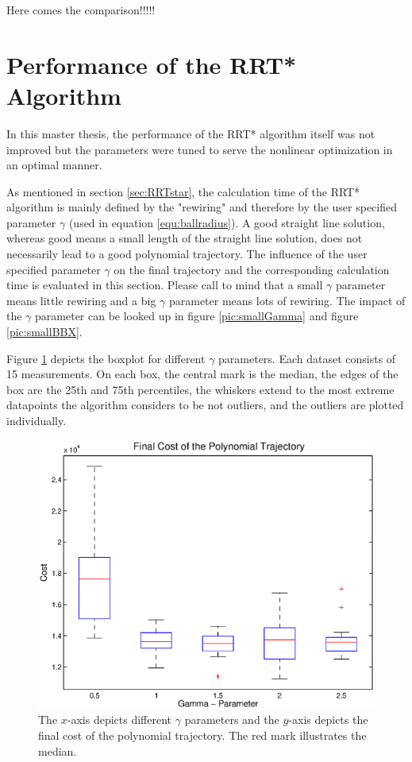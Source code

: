 Here comes the comparison!!!!!

\newpage


\section{Performance of the RRT* Algorithm}

In this master thesis, the performance of the RRT* algorithm itself was not improved but the parameters were tuned to serve the nonlinear optimization in an optimal manner.

As mentioned in section \ref{sec:RRTstar}, the calculation time of the RRT* algorithm is mainly defined by the "rewiring" and therefore by the user specified parameter $\gamma$ (used in equation \ref{equ:ballradius}). A good straight line solution, whereas good means a small length of the straight line solution, does not necessarily lead to a good polynomial trajectory. The influence of the user specified parameter $\gamma$ on the final trajectory and the corresponding calculation time is evaluated in this section. \newline
Please call to mind that a small $\gamma$ parameter means little rewiring and a big $\gamma$ parameter means lots of rewiring. The impact of the $\gamma$ parameter can be looked up in figure \ref{pic:smallGamma} and figure \ref{pic:smallBBX}.\newline

Figure \ref{pic:boxplot} depicts the boxplot for different $\gamma$ parameters. Each dataset consists of 15 measurements. On each box, the central mark is the median, the edges of the box are the 25th and 75th percentiles, the whiskers extend to the most extreme
datapoints the algorithm considers to be not outliers, and the outliers are plotted individually. 


\begin{figure}[H]
   \centering
   \includegraphics[trim = 14mm 10mm 15mm 0mm,clip,width=1\textwidth]{pics/boxplot1.eps}
   \caption{The $x$-axis depicts different $\gamma$ parameters and the $y$-axis depicts the final cost of the polynomial trajectory. The red mark illustrates the median. }
   \label{pic:boxplot}
\end{figure}


